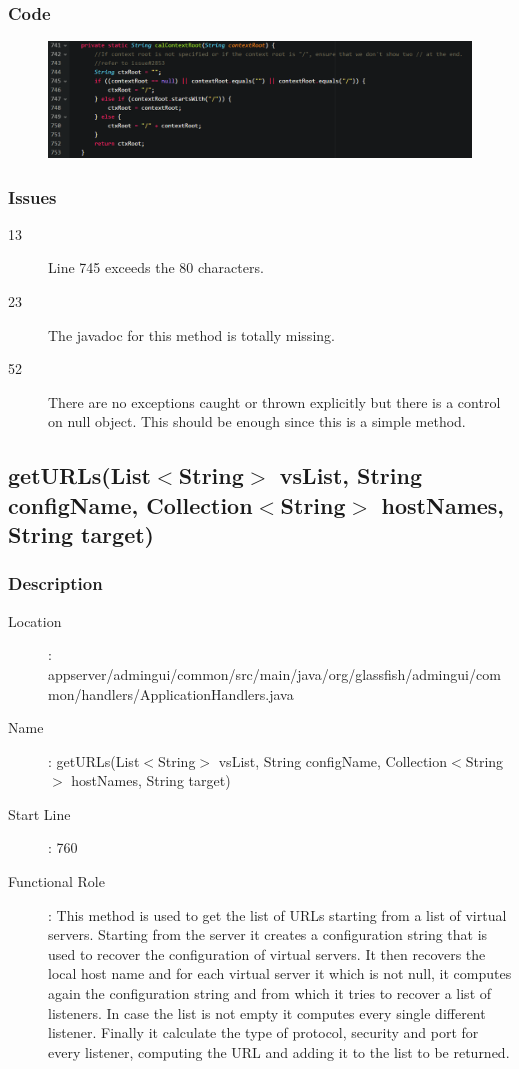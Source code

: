 			\subsubsection{Code}
			\begin{figure}[h!]
				\includegraphics[width=\textwidth]{../SE2_CODE/calContextRoot}
			\end{figure}
			\subsubsection{Issues}
			\begin{description}
				\item[13] Line 745 exceeds the 80 characters.
				\item[23] The javadoc for this method is totally missing.
				\item[52] There are no exceptions caught or thrown explicitly but there is a control on null object. This should be enough since this is a simple method.
			\end{description}
		\newpage
		\subsection{getURLs(List$<$String$>$ vsList, String configName, Collection$<$String$>$ hostNames, String target)}
			\subsubsection{Description}
			\begin{description}
			\item[Location]: appserver/admingui/common/src/main/java/org/glassfish/admingui/common/handlers/ApplicationHandlers.java
			\item[Name]: getURLs(List$<$String$>$ vsList, String configName, Collection$<$String$>$ hostNames, String target)
			\item[Start Line]: 760
			\item[Functional Role]: This method is used to get the list of URLs starting from a list of virtual servers. Starting from the server it creates a configuration string
			that is used to recover the configuration of virtual servers. It then recovers the local host name and for each virtual server it which is not null, it computes again
			the configuration string and from which it tries to recover a list of listeners. In case the list is not empty it computes every single different listener. Finally it
			calculate	the type of protocol, security and port for every listener, computing the URL and adding it to the list to be returned.
			\end{description}
			\newpage
